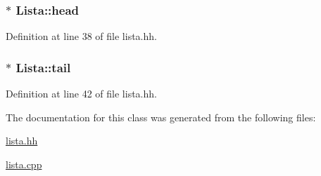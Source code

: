 \subsubsection[{head}]{$\ast$ Lista\+::head\hspace{0.3cm}{\ttfamily [private]}}\label{class_lista_aeba20505030183d334971bd44c3c8b95}


Definition at line 38 of file lista.\+hh.

\hypertarget{class_lista_a7d42e5f99e945d97c29d6f764f71f4e7}{}
\subsubsection[{tail}]{$\ast$ Lista\+::tail\hspace{0.3cm}{\ttfamily [private]}}\label{class_lista_a7d42e5f99e945d97c29d6f764f71f4e7}


Definition at line 42 of file lista.\+hh.



The documentation for this class was generated from the following files\+:\begin{DoxyCompactItemize}
\item 
\hyperlink{lista_8hh}{lista.\+hh}\item 
\hyperlink{lista_8cpp}{lista.\+cpp}\end{DoxyCompactItemize}
